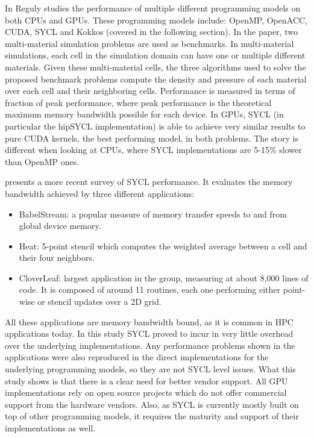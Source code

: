 In \cite{performance_portability_multimaterial_kernels} Reguly studies the performance of multiple different programming models on both CPUs and GPUs. These programming models include: OpenMP, OpenACC, CUDA, SYCL and Kokkos (covered in the following section). In the paper, two multi-material simulation problems are used as benchmarks. In multi-material simulations, each cell in the simulation domain can have one or multiple different materials. Given these multi-material cells, the three algorithms used to solve the proposed benchmark problems compute the density and pressure of each material over each cell and their neighboring cells. Performance is measured in terms of fraction of peak performance, where peak performance is the theoretical maximum memory bandwidth possible for each device. In GPUs, SYCL (in particular the hipSYCL implementation) is able to achieve very similar results to pure CUDA kernels, the best performing model, in both problems. The story is different when looking at CPUs, where SYCL implementations are 5-15\% slower than OpenMP ones.

\cite{sycl_hpc_applications} presents a more recent survey of SYCL performance. It evaluates the memory bandwidth achieved by three different applications: 
\begin{itemize}
    \item BabelStream: a popular measure of memory transfer speeds to and from global device memory.
    \item Heat: 5-point stencil which computes the weighted average between a cell and their four neighbors.
    \item CloverLeaf: largest application in the group, measuring at about 8,000 lines of code. It is composed of around 11 routines, each one performing either point-wise or stencil updates over a 2D grid.
\end{itemize}
All these applications are memory bandwidth bound, as it is common in HPC applications today.
In this study SYCL proved to incur in very little overhead over the underlying implementations. Any performance problems shown in the applications were also reproduced in the direct implementations for the underlying programming models, so they are not SYCL level issues. What this study shows is that there is a clear need for better vendor support. All GPU implementations rely on open source projects which do not offer commercial support from the hardware vendors. Also, as SYCL is currently mostly built on top of other programming models, it requires the maturity and support of their implementations as well.

